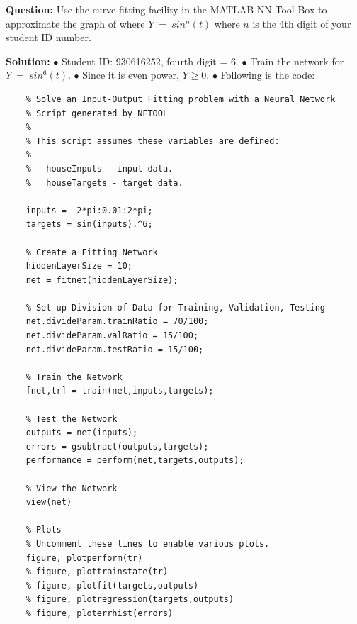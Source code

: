 \documentclass[12pt]{article}
\begin{document}
\textbf{Question:} Use the curve fitting facility in the MATLAB NN Tool Box to approximate the graph of where $Y \ = \ sin^n(t)$ where $n$ is the 4th digit of your student ID number.

\BlankLine
\BlankLine

\textbf{Solution:} 
\BlankLine
$\bullet$ Student ID: 930616252, fourth digit = 6.\BlankLine
$\bullet$ Train the network for $Y \ = \ sin^6(t)$. \BlankLine
$\bullet$ Since it is even power, $Y \geq 0$. \BlankLine
$\bullet$ Following is the code:


 \begin{verbatim}
	% Solve an Input-Output Fitting problem with a Neural Network
	% Script generated by NFTOOL
	%
	% This script assumes these variables are defined:
	%
	%   houseInputs - input data.
	%   houseTargets - target data.
	
	inputs = -2*pi:0.01:2*pi;
	targets = sin(inputs).^6;
	
	% Create a Fitting Network
	hiddenLayerSize = 10;
	net = fitnet(hiddenLayerSize);
	
	% Set up Division of Data for Training, Validation, Testing
	net.divideParam.trainRatio = 70/100;
	net.divideParam.valRatio = 15/100;
	net.divideParam.testRatio = 15/100;
	
	% Train the Network
	[net,tr] = train(net,inputs,targets);
	
	% Test the Network
	outputs = net(inputs);
	errors = gsubtract(outputs,targets);
	performance = perform(net,targets,outputs);
	
	% View the Network
	view(net)
	
	% Plots
	% Uncomment these lines to enable various plots.
	figure, plotperform(tr)
	% figure, plottrainstate(tr)
	% figure, plotfit(targets,outputs)
	% figure, plotregression(targets,outputs)
	% figure, ploterrhist(errors)
\end{verbatim}
\end{document}
